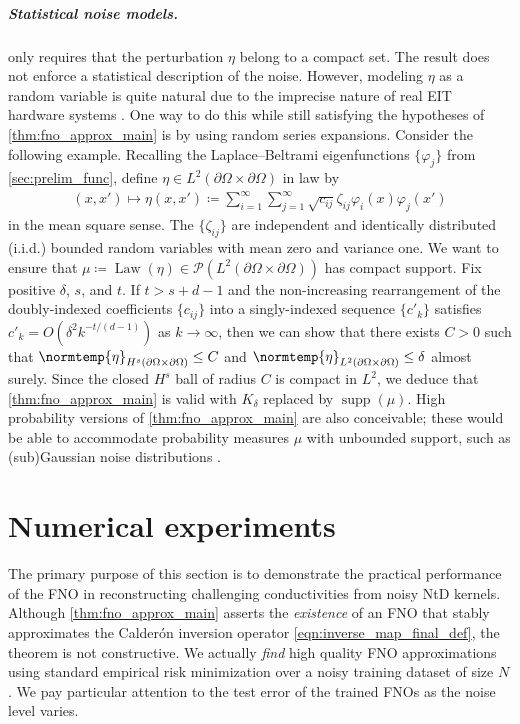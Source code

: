 \documentclass[pdflatex,sn-mathphys-num]{sn-jnl-preprint}
\newcommand{\sP}{\mathscr{P}}
\newcommand{\pOmega}{{\partial\Omega}}
\newcommand{\norm}{\normtemp}
\newcommand{\defeq}{\coloneqq} %
\newcommand{\Law}{\operatorname{Law}} %
\DeclareMathOperator{\supp}{supp} %
\theoremstyle{thmstyleone}%
\theoremstyle{thmstyletwo}%
\theoremstyle{thmstylethree}%
\numberwithin{equation}{section}
\numberwithin{theorem}{section}
\begin{document}
\subparagraph*{\emph{\textbf{Statistical noise models.}}}
 only requires that the perturbation $\eta$ belong to a compact set. The result does not enforce a statistical description of the noise. However, modeling $\eta$ as a random variable is quite natural due to the imprecise nature of real EIT hardware systems \cite[Sec.~4]{garde2017convergence}. One way to do this while still satisfying the hypotheses of \cref{thm:fno_approx_main} is by using random series expansions. Consider the following example. Recalling the Laplace--Beltrami eigenfunctions $\{\varphi_j\}$ from \cref{sec:prelim_func}, define $\eta\in L^2(\pOmega\times\pOmega)$ in law by
\begin{align}\label{eqn:kle_2d_boundary}
    (x,x')\mapsto \eta(x,x')\defeq \sum_{i=1}^\infty\sum_{j=1}^\infty \sqrt{c_{ij}}\zeta_{ij}\varphi_i(x)\varphi_j(x')
\end{align}
in the mean square sense. The $\{\zeta_{ij}\}$ are independent and identically distributed (i.i.d.) bounded random variables with mean zero and variance one. We want to ensure that $\mu\defeq\Law(\eta)\in\sP(L^2(\pOmega\times\pOmega))$ has compact support. Fix positive $\delta$, $s$, and $t$. If $t>s+d-1$ and the non-increasing rearrangement of the doubly-indexed coefficients $\{c_{ij}\}$ into a singly-indexed sequence $\{c'_k\}$ satisfies $c'_k=O(\delta^2k^{-t/(d-1)})$ as $k\to\infty$, then we can show that there exists $C>0$ such that $\norm{\eta}_{H^s(\pOmega\times\pOmega)}\leq C$ and $\norm{\eta}_{L^2(\pOmega\times\pOmega)}\leq \delta$ almost surely. Since the closed $H^s$ ball of radius $C$ is compact in $L^2$, we deduce that \cref{thm:fno_approx_main} is valid with $K_\delta$ replaced by $\supp(\mu)$. High probability versions of \cref{thm:fno_approx_main} are also conceivable; these would be able to accommodate probability measures $\mu$ with unbounded support, such as (sub)Gaussian noise distributions \cite{pineda2023deep}.


\section{Numerical experiments}\label{sec:numerics}
The primary purpose of this section is to demonstrate the practical performance of the FNO in reconstructing challenging conductivities from noisy NtD kernels. Although \cref{thm:fno_approx_main} asserts the \emph{existence} of an FNO that stably approximates the Calder\'on inversion operator \eqref{eqn:inverse_map_final_def}, the theorem is not constructive. We actually \emph{find} high quality FNO approximations using standard empirical risk minimization over a noisy training dataset of size $N$. We pay particular attention to the test error of the trained FNOs as the noise level varies.
\end{document}

